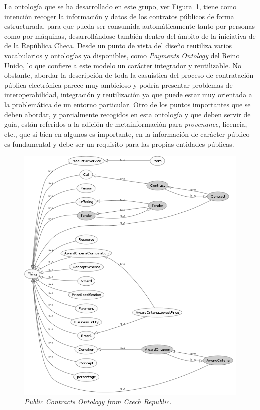 La ontología que se ha desarrollado en este grupo, ver Figura~\ref{fig:public-contracts-ontology}, tiene como intención recoger
la información y datos de los contratos públicos de forma estructurada, para que pueda ser consumida
automáticamente tanto por personas como por máquinas, desarrollándose también dentro del ámbito
de la iniciativa de \opendata de la República Checa. Desde un punto de vista del diseño reutiliza varios
vocabularios y ontologías ya disponibles, como \textit{Payments Ontology} del Reino Unido, lo que confiere a este modelo un carácter integrador y 
reutilizable. No obstante, abordar la descripción de toda la casuística del proceso de contratación pública electrónica parece
muy ambicioso y podría presentar problemas de interoperabilidad, integración y reutilización ya que 
puede estar muy orientada a la problemática de un entorno particular. Otro de los puntos importantes
que se deben abordar, y parcialmente recogidos en esta ontología y que deben servir de guía, están referidos a 
la adición de metainformación para \textit{provenance}, licencia, etc., que si bien en algunos
\datasets es importante, en la información de carácter público es fundamental y debe ser un requisito
para las propias entidades públicas.

\begin{figure}[h]
 \centering
    \includegraphics[width=14cm]{images/phd/public-contracts-ontology}
  \caption{\textit{Public Contracts Ontology from Czech Republic.}}
 \label{fig:public-contracts-ontology}
\end{figure}


